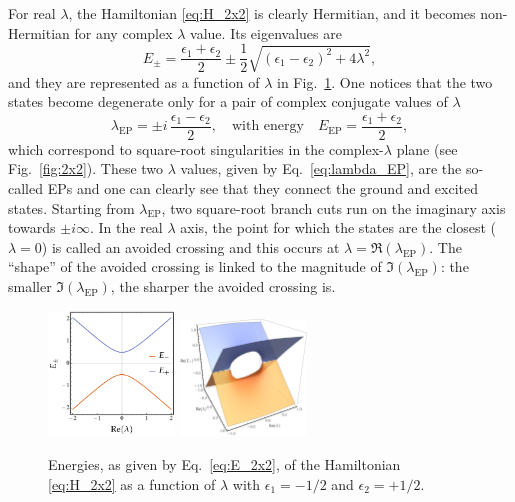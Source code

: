 \documentclass[11pt,a4paper]{article}
\begin{document}
For real $\lambda$, the Hamiltonian \eqref{eq:H_2x2} is clearly Hermitian, and it becomes non-Hermitian for any complex $\lambda$ value.
Its eigenvalues are
\begin{equation}
\label{eq:E_2x2}
	E_{\pm} = \frac{\epsilon_1 + \epsilon_2}{2} \pm \frac{1}{2} \sqrt{(\epsilon_1 - \epsilon_2)^2 + 4\lambda^2},
\end{equation}
and they are represented as a function of $\lambda$ in Fig.~\ref{fig:2x2}.
One notices that the two states become degenerate only for a pair of complex conjugate values of $\lambda$
\begin{equation}
\label{eq:lambda_EP}
	\lambda_\text{EP} = \pm i\,\frac{\epsilon_1 - \epsilon_2}{2},
	\quad
	\text{with energy}	
	\quad
	E_\text{EP} = \frac{\epsilon_1 + \epsilon_2}{2},
\end{equation}
which correspond to square-root singularities in the complex-$\lambda$ plane (see Fig.~\eqref{fig:2x2}).
These two $\lambda$ values, given by Eq.~\eqref{eq:lambda_EP}, are the so-called EPs and one can clearly see that they connect the ground and excited states.
Starting from $\lambda_\text{EP}$, two square-root branch cuts run on the imaginary axis towards $\pm i \infty$.
In the real $\lambda$ axis, the point for which the states are the closest ($\lambda = 0$) is called an avoided crossing and this occurs at $\lambda = \Re(\lambda_\text{EP})$.
The ``shape'' of the avoided crossing is linked to the magnitude of $\Im(\lambda_\text{EP})$: the smaller $\Im(\lambda_\text{EP})$, the sharper the avoided crossing is.

\begin{figure}[h!]
    \centering
    \includegraphics[width=0.3\textwidth]{2x2.pdf}
    \hspace{0.2\textwidth}
    \includegraphics[width=0.3\textwidth]{i2x2.pdf}
    \caption{Energies, as given by Eq.~\ref{eq:E_2x2}, of the Hamiltonian \eqref{eq:H_2x2} as a function of $\lambda$ with $\epsilon_1 = -1/2$ and $\epsilon_2 = +1/2$.}
    \label{fig:2x2}
\end{figure}
\end{document}
